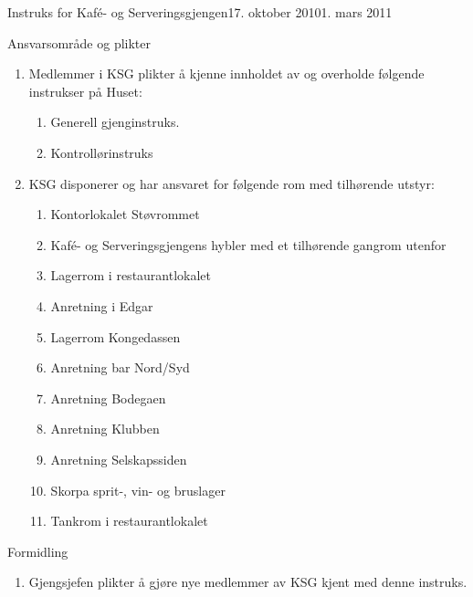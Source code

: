\begin{instruks}{Instruks for Kaf\'e- og Serveringsgjengen}{17. oktober 2010}{1. mars 2011}
    \begin{instruksledd}{Ansvarsområde og plikter}
        \begin{enumerate}
            \item  Medlemmer i KSG plikter å kjenne innholdet av og overholde følgende instrukser på
                Huset:
                \begin{enumerate}
                    \item Generell gjenginstruks.
                    \item Kontrollørinstruks
                \end{enumerate}
            \item KSG disponerer og har ansvaret for følgende rom med tilhørende utstyr:
                \begin{enumerate}
                    \item Kontorlokalet Støvrommet
                    \item Kafé- og Serveringsgjengens hybler med et tilhørende gangrom utenfor
                    \item Lagerrom i restaurantlokalet
                    \item Anretning i Edgar
                    \item Lagerrom Kongedassen
                    \item Anretning bar Nord/Syd
                    \item Anretning Bodegaen
                    \item Anretning Klubben
                    \item Anretning Selskapssiden
                    \item Skorpa sprit-, vin- og bruslager
                    \item Tankrom i restaurantlokalet
                \end{enumerate}
        \end{enumerate}
    \end{instruksledd}

    \begin{instruksledd}{Formidling}
        \begin{enumerate}
            \item Gjengsjefen plikter å gjøre nye medlemmer av KSG kjent med denne instruks.
        \end{enumerate}
    \end{instruksledd}

\end{instruks}


